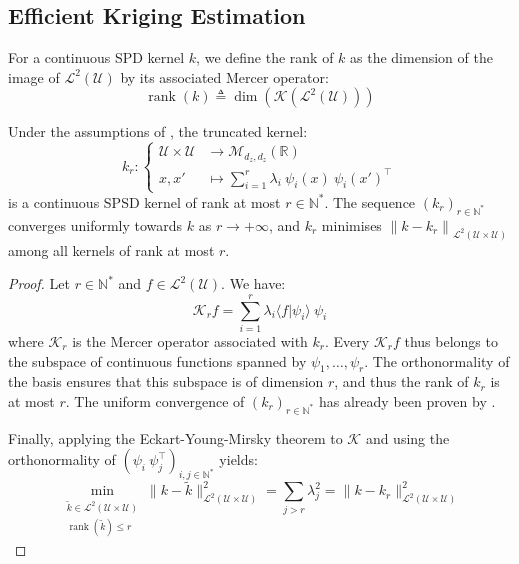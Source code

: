 \subsection{Efficient Kriging Estimation}

\begin{proposition}\label{th:reduced_rank}
	For a continuous SPD kernel $k$, we define the rank of $k$ as the dimension of the image of $\mathcal{L}^2(\mathcal{U})$ by its associated Mercer operator:
	\begin{equation}
		\operatorname{rank}(k)\triangleq\operatorname{dim}\left(\mathcal{K}\left(\mathcal{L}^2(\mathcal{U})\right)\right)
	\end{equation}

	Under the assumptions of , the truncated kernel:
	\begin{equation}
		k_r:\left\{\begin{aligned}
		\mathcal{U}\times\mathcal{U}&\to\mathcal{M}_{d_z,d_z}(\mathbb{R})\\
		x,x'&\mapsto\sum_{i=1}^{r}\lambda_i\:\psi_i(x)\:\psi_i(x')^\top
		\end{aligned}\right.
	\end{equation}
	is a continuous SPSD kernel of rank at most $r\in\mathbb{N}^*$. The sequence $(k_r)_{r\in\mathbb{N}^*}$ converges uniformly towards $k$ as $r\to+\infty$, and $k_r$ minimises $\left\|k-k_r\right\|_{\mathcal{L}^2(\mathcal{U}\times\mathcal{U})}$ among all kernels of rank at most $r$.
\end{proposition}

\begin{proof}
	Let $r\in\mathbb{N}^*$ and $f\in\mathcal{L}^2(\mathcal{U})$. We have:
	\begin{equation}
		\mathcal{K}_rf=\sum_{i=1}^r\lambda_i\langle f|\psi_i\rangle\:\psi_i
	\end{equation}
	where $\mathcal{K}_r$ is the Mercer operator associated with $k_r$. Every $\mathcal{K}_rf$ thus belongs to the subspace of continuous functions spanned by $\psi_1,\dots,\psi_r$. The orthonormality of the basis ensures that this subspace is of dimension $r$, and thus the rank of $k_r$ is at most $r$. The uniform convergence of $(k_r)_{r\in\mathbb{N}^*}$ has already been proven by .

	Finally, applying the Eckart-Young-Mirsky theorem to $\mathcal{K}$ and using the orthonormality of $(\psi_i\:\psi_j^\top)_{i,j\in\mathbb{N}^*}$ yields:
	\begin{equation}
		\underset{\substack{\tilde{k}\in\mathcal{L}^2(\mathcal{U}\times\mathcal{U})\\\operatorname{rank}(\tilde{k})\leq r}}{\min}\|k-\tilde{k}\|_{\mathcal{L}^2(\mathcal{U}\times\mathcal{U})}^2=\sum_{j>r}\lambda_j^2=\|k-k_r\|_{\mathcal{L}^2(\mathcal{U}\times\mathcal{U})}^2
	\end{equation}
\end{proof}

